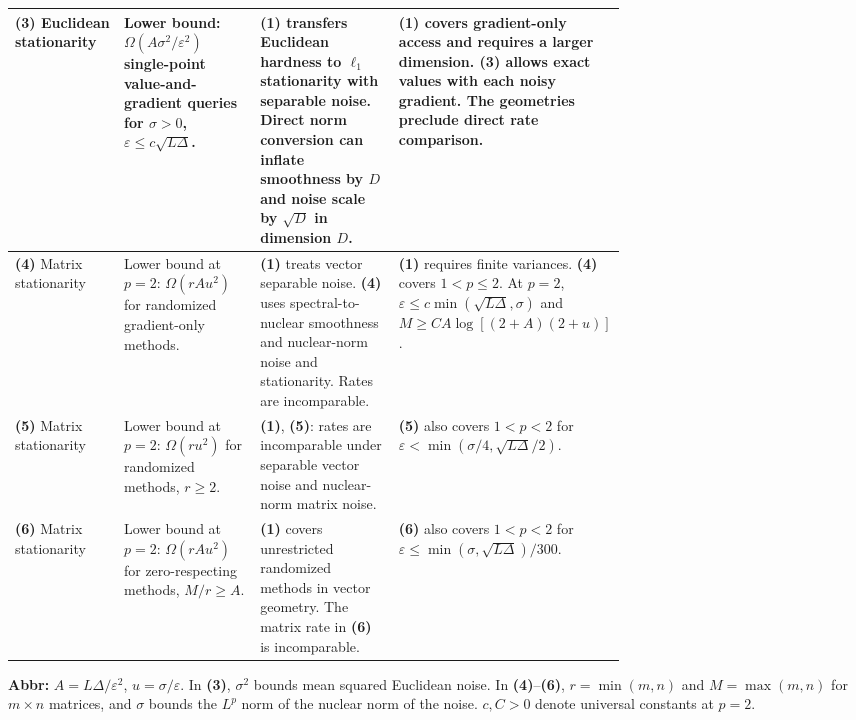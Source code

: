 \begin{table}[tp]
\begin{threeparttable}
\begin{tabularx}{\linewidth}{@{}>{\raggedright\arraybackslash}p{0.19\linewidth}>{\raggedright\arraybackslash}p{0.26\linewidth}>{\raggedright\arraybackslash}p{0.26\linewidth}>{\raggedright\arraybackslash}X@{}}
\midrule
\textbf{(3)} Euclidean stationarity \citep[Thm.~3, Eq.~(23)]{hdabcArjevaniV2}
& Lower bound: $\Omega(A\sigma^2/\varepsilon^2)$ single-point value-and-gradient queries for $\sigma>0$, $\varepsilon\le c\sqrt{L\Delta}$.
& \textbf{(1)} transfers Euclidean hardness to $\ell_1$ stationarity with separable noise. Direct norm conversion can inflate smoothness by $D$ and noise scale by $\sqrt D$ in dimension $D$.
& \textbf{(1)} covers gradient-only access and requires a larger dimension. \textbf{(3)} allows exact values with each noisy gradient. The geometries preclude direct rate comparison. \\
\midrule
\textbf{(4)} Matrix stationarity \citep[Thm.~3.1]{hdslZhangLinV4}
& Lower bound at $p=2$: $\Omega(r A u^2)$ for randomized gradient-only methods.
& \textbf{(1)} treats vector separable noise. \textbf{(4)} uses spectral-to-nuclear smoothness and nuclear-norm noise and stationarity. Rates are incomparable.
& \textbf{(1)} requires finite variances. \textbf{(4)} covers $1<p\le2$. At $p=2$, $\varepsilon\le c\min(\sqrt{L\Delta},\sigma)$ and $M\ge C A\log[(2+A)(2+u)]$. \\
\midrule
\textbf{(5)} Matrix stationarity \citep[Thm.~3.7]{fvssHubler2026v1}
& Lower bound at $p=2$: $\Omega(r u^2)$ for randomized methods, $r\ge2$.
& \textbf{(1)}, \textbf{(5)}: rates are incomparable under separable vector noise and nuclear-norm matrix noise.
& \textbf{(5)} also covers $1<p<2$ for $\varepsilon<\min(\sigma/4,\sqrt{L\Delta}/2)$. \\
\midrule
\textbf{(6)} Matrix stationarity \citep[Thm.~E.9]{fvssHubler2026v1}
& Lower bound at $p=2$: $\Omega(r A u^2)$ for zero-respecting methods, $M/r\ge A$.
& \textbf{(1)} covers unrestricted randomized methods in vector geometry. The matrix rate in \textbf{(6)} is incomparable.
& \textbf{(6)} also covers $1<p<2$ for $\varepsilon\le\min(\sigma,\sqrt{L\Delta})/300$. \\
\bottomrule
\end{tabularx}
\begin{tablenotes}[flushleft]\footnotesize
\item[] \textbf{Abbr:} $A=L\Delta/\varepsilon^2$, $u=\sigma/\varepsilon$. In \textbf{(3)}, $\sigma^2$ bounds mean squared Euclidean noise. In \textbf{(4)}--\textbf{(6)}, $r=\min(m,n)$ and $M=\max(m,n)$ for $m\times n$ matrices, and $\sigma$ bounds the $L^p$ norm of the nuclear norm of the noise. $c,C>0$ denote universal constants at $p=2$.
\end{tablenotes}
\end{threeparttable}
\end{table}
